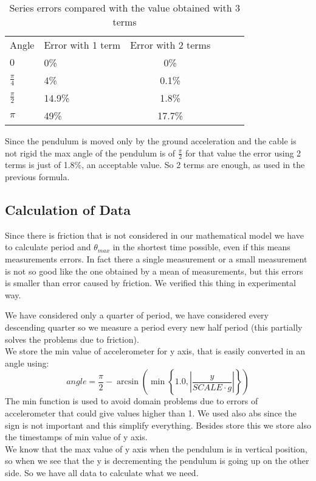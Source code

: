 \begin{table}[H]
	\small
	\begin{center}
		
		\caption{Series errors compared with the value obtained with 3 terms}
		\begin{tabular}{l|lcc|L{2cm}l}
			Angle & Error with 1 term & Error with 2 terms\\
			$0$ & 0\% & 0\%\\			
			$\frac{\pi}{4}$ & 4\% & 0.1\%\\			
			$\frac{\pi}{2}$ & 14.9\% & 1.8\%\\			
			$\pi$ & 49\% & 17.7\%\\			
		\end{tabular}
		\label{tab:errors}
	\end{center}
\end{table}

Since the pendulum is moved only by the ground acceleration and the cable is not rigid the max angle of the pendulum is of $\frac{\pi}{2}$ for that value the error using 2 terms is just of 1.8\%, an acceptable value. So 2 terms are enough, as used in the previous formula.

\subsection{Calculation of Data}
\label{sec:datacalc}

Since there is friction that is not considered in our mathematical model we have to calculate period and $\theta_{max}$ in the shortest time possible, even if this means measurements errors. In fact there a single measurement or a small measurement is not so good like the one obtained by a mean of measurements, but this errors is smaller than error caused by friction. We verified this thing in experimental way.\par

We have considered only a quarter of period, we have considered every descending quarter so we measure a period every new half period (this partially solves the problems due to friction).\\
We store the min value of accelerometer for y axis, that is easily converted in an angle using:
$$angle = \frac{\pi}{2} -\arcsin\left(\min\left\lbrace1.0, \left|\frac{y}{SCALE \cdot g}\right|\right\rbrace\right)$$
The min function is used to avoid domain problems due to errors of accelerometer that could give values higher than 1. We used also abs since the sign is not important and this simplify everything.
Besides store this we store also the timestamps of min value of y axis.\\
We know that the max value of y axis when the pendulum is in vertical position, so when we see that the y is decrementing the pendulum is going up on the other side. So we have all data to calculate what we need.\par

